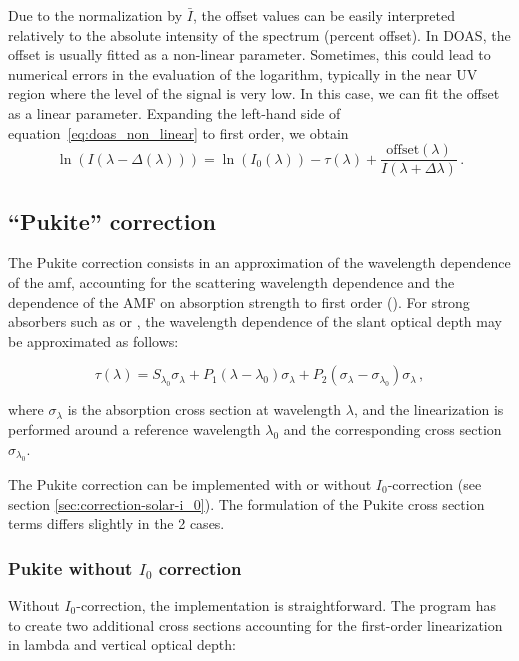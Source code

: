 Due to the normalization by $\bar{I}$, the offset values can be easily
interpreted relatively to the absolute intensity of the spectrum
(percent offset).  In DOAS, the offset is usually fitted as a
non-linear parameter.  Sometimes, this could lead to numerical errors
in the evaluation of the logarithm, typically in the near UV region
where the level of the signal is very low.  In this case, we can fit
the offset as a linear parameter.  Expanding the left-hand side of
equation~\eqref{eq:doas_non_linear} to first order, we obtain
\begin{equation}
  \label{eq:offset_linear}
  \ln(I(\lambda -\Delta(\lambda))) = \ln(I_0(\lambda))-\tau(\lambda) + \frac{\mathrm{offset}(\lambda)}{I(\lambda+\Delta\lambda)}\,.
\end{equation}

\subsection{``Pukite'' correction}\label{pukite-terms}
The Pukite correction consists in an approximation of the wavelength
dependence of the \gls{amf}, accounting for the scattering wavelength
dependence and the dependence of the AMF on absorption strength to
first order (\citet{Pukite2010}).   For strong absorbers such as \ozone{} or , the wavelength dependence of the slant optical depth may be approximated as follows:

\begin{equation}
  \label{eq:pukite-o3-example}
\tau(\lambda)= S_{\lambda_0} \sigma_{\lambda}+P_1 (\lambda-\lambda_0 ) \sigma_{\lambda}+P_2 (\sigma_{\lambda}-\sigma_{\lambda_0}) \sigma_{\lambda} \,,
\end{equation}

where $\sigma_{\lambda}$ is the absorption cross section at wavelength $\lambda$, and the linearization is performed around a reference wavelength $\lambda_0$ and the corresponding cross section $\sigma_{\lambda_0}$.

The Pukite correction can be implemented with or without $I_0$-correction (see section \ref{sec:correction-solar-i_0}). The
formulation of the Pukite cross section terms differs slightly in the 2
cases.

\subsubsection{Pukite without $I_0$ correction}\label{pukite-without-i0-correction}
Without $I_0$-correction, the implementation is
straightforward. The program has to create two additional cross sections
accounting for the first-order linearization in lambda and vertical
optical depth:

